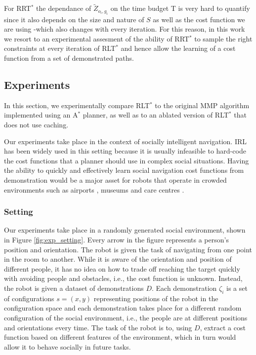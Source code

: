 \documentclass[a4paper,11pt]{report}
\begin{document}


For RRT$^*$ the dependance of $\tilde{Z}_{o_i,g_i}$ on the time budget T is very hard to quantify since it also depends on the size and nature of $S$ as well as the cost function we are using -which also changes with every iteration. For this reason, in this work we resort to an experimental assesment of the ability of RRT$^*$ to sample the right constraints at every iteration of RLT$^*$ and hence allow the learning of a cost function from a set of demonstrated paths.


\subsection{Experiments}
In this section, we experimentally compare RLT$^*$ to the original MMP algorithm implemented using an A$^*$ planner, as well as to an ablated version of RLT$^*$ that does not use caching.
	
	Our experiments take place in the context of socially intelligent navigation. IRL has been widely used in this setting \cite{okallearning,henry2010learning,vasquez2014inverse} because it is usually infeasible to hard-code the cost functions that a planner should use in complex social situations. Having the ability to quickly and effectively learn social navigation cost functions from demonstration would be a major asset for robots that operate in crowded environments such as airports \cite{triebel2015spencer}, museums \cite{thrun1999minerva} and care centres \cite{shiarlis2015teresa}.
	
\subsubsection{Setting}
	Our experiments take place in a randomly generated social environment, shown in Figure \ref{fig:exp_setting}. Every arrow in the figure represents a person's position and orientation. The robot is given the task of navigating from one point in the room to another. While it is aware of the orientation and position of different people, it has no idea on how to trade off reaching the target quickly with avoiding people and obstacles, i.e., the cost function is unknown. Instead, the robot is given a dataset of demonstrations $D$. Each demonstration $\zeta_i$ is a set of configurations $s = (x,y)$ representing positions of the robot in the configuration space and each demonstration takes place for a different random configuration of the social environment, i.e., the people are at different positions and orientations every time. The task of the robot is to, using $D$, extract a cost function based on different features of the environment, which in turn would allow it to behave socially in future tasks.
\end{document}
